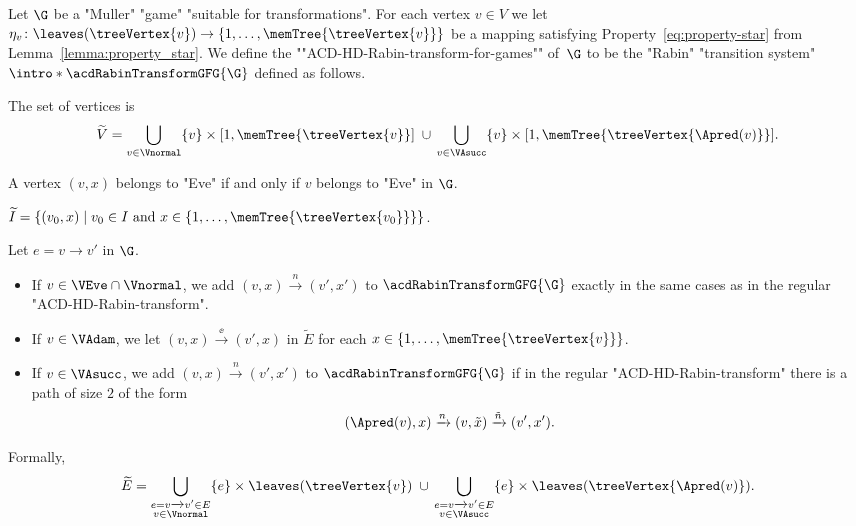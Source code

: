\documentclass[10pt,a4paper]{amsart}
\renewcommand{\gg}{\gamma}
\newcommand{\tand}{\text{ and }}
\newcommand{\re}[1]{\xrightarrow{#1}}
\begin{document}
\begin{definition}\label{def-ACD:RabinGFGTransformationACD}
	Let $\G$ be a "Muller" "game" "suitable for transformations". 
 	For each vertex $v\in V$ we let $\eta_v \colon \leaves(\treeVertex{v}) \to \{1,\dots, \memTree{\treeVertex{v}}\}$ be a mapping satisfying Property~\eqref{eq:property-star} from Lemma~\ref{lemma:property_star}.	
 	\AP We define the ""ACD-HD-Rabin-transform-for-games"" of~$\G$ to be the "Rabin" "transition system" $\intro*\acdRabinTransformGFG{\G}$ %
 	defined as follows.
 	\begin{description}
 		\setlength\itemsep{2mm}
 		\item[Vertices.] The set of vertices is \[\widetilde{V} = \bigcup_{v\in \Vnormal}  \{v\} \times [1,\memTree{\treeVertex{v}}]  \;\cup\, \bigcup_{v\in \VAsucc}  \{v\} \times [1,\memTree{\treeVertex{\Apred(v)}}] .\]
 		
 		\item[Players partition.] A vertex $(v,x)$ belongs to "Eve" if and only if $v$ belongs to "Eve" in $\G$.
 		
 		\item[Initial vertices.] $\widetilde{I} = \{ (v_0, x) \mid v_0\in I \tand x \in \{1,\dots, \memTree{\treeVertex{v_0}}\} \}$.
 		
 		\item[Edges and output colours.] %
 		Let $e = v\re{} v'$ in $\G$.
 		\begin{itemize}
 			\item 	If $v\in \VEve\cap \Vnormal$, we add $(v, x) \re{n} (v',x')$ to $\acdRabinTransformGFG{\G}$ exactly in the same cases as in the regular "ACD-HD-Rabin-transform".
 			\item If $v\in \VAdam$, we let $(v,x)\re{\ee}(v',x)$ in $\widetilde{E}$ for each $x\in \{1,\dots, \memTree{\treeVertex{v}}\}$. 
 			\item If $v\in \VAsucc$, we add $(v, x) \re{n} (v',x')$ to $\acdRabinTransformGFG{\G}$ if in the regular "ACD-HD-Rabin-transform" there is a path of size $2$ of the form 
 			\[ (\Apred(v),x)\re{n} (v, \tilde{x}) \re{\tilde{n}} (v',x').  \]
 		\end{itemize}
 			Formally, \[\widetilde{E} = \bigcup_{\substack{e=v\re{}v'\in E\\ v\in \Vnormal}}  \{e\} \times \leaves(\treeVertex{v}) \;\cup\, \bigcup_{\substack{e=v\re{}v'\in E\\v\in \VAsucc}}  \{e\} \times \leaves(\treeVertex{\Apred(v)}).\]
 		

\end{description}
\end{definition}
\end{document}
